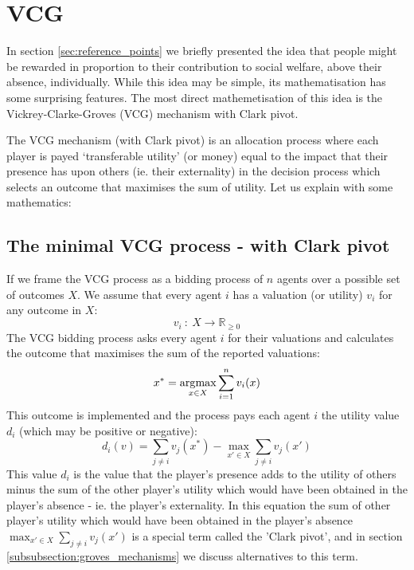 \section{VCG}\label{sec:solutions_VCG}

In section \ref{sec:reference_points} we briefly presented the idea that people might be rewarded in proportion to their contribution to social welfare, above their absence, individually.
While this idea may be simple, its mathematisation has some surprising features.
The most direct mathemetisation of this idea is the Vickrey-Clarke-Groves (VCG) mechanism with Clark pivot.

The VCG mechanism (with Clark pivot) is an allocation process where each player is payed `transferable utility' (or money) equal to the impact that their presence has upon others (ie. their externality) in the decision process which selects an outcome that maximises the sum of utility.
Let us explain with some mathematics:

\subsection{The minimal VCG process - with Clark pivot}
If we frame the VCG process as a bidding process of $n$ agents over a possible set of outcomes $X$.
We assume that every agent $i$ has a valuation (or utility) $v_i$ for any outcome in $X$:
$$ v_i~:~X\rightarrow \mathbb{R}_{\ge 0} $$
The VCG bidding process asks every agent $i$ for their valuations and calculates the outcome that maximises the sum of the reported valuations:
$$ x^* = \operatorname*{\arg\!\max}_{x\in X}\sum_{i=1}^{n}v_i(x) $$
This outcome is implemented and the process pays each agent $i$ the utility value $d_i$ (which may be positive or negative):
\begin{equation}\label{eq:VCG_payment_rule} d_i(v)=\sum_{j\ne i}v_j(x^*) - \max_{x'\in X}\sum_{j\ne i}v_j(x') \end{equation}
This value $d_i$ is the value that the player's presence adds to the utility of others minus the sum of the other player's utility which would have been obtained in the player's absence - ie. the player's externality.
In this equation the sum of other player's utility which would have been obtained in the player's absence $\max_{x'\in X}\sum_{j\ne i}v_j(x')$ is a special term called the 'Clark pivot', and in section \ref{subsubsection:groves_mechanisms} we discuss alternatives to this term.


